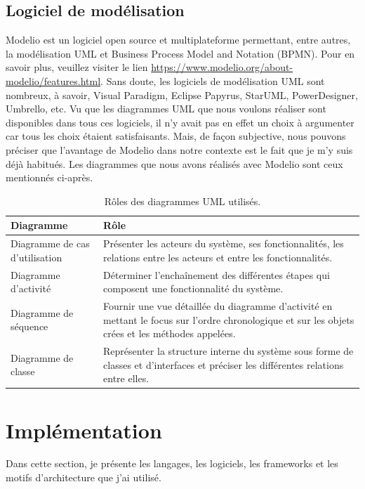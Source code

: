 \subsection{Logiciel de modélisation}
Modelio est un logiciel open source et multiplateforme permettant, entre autres, la modélisation UML et Business Process Model and Notation (BPMN). Pour en savoir plus, veuillez visiter le lien \href{https://www.modelio.org/about-modelio/features.html}{https://www.modelio.org/about-modelio/features.html}.
\newline
Sans doute, les logiciels de modélisation UML sont nombreux, à savoir, Visual Paradigm, Eclipse Papyrus, StarUML, PowerDesigner, Umbrello, etc. Vu que les diagrammes UML que nous voulons réaliser sont disponibles dans tous ces logiciels, il n’y avait pas en effet un choix à argumenter car
tous les choix étaient satisfaisants. Mais, de façon subjective, nous pouvons préciser que l’avantage de Modelio dans notre contexte est le fait que je m'y suis	 déjà habitués. Les diagrammes que nous avons réalisés avec Modelio sont ceux mentionnés ci-après.
\newline\newline
\begin{table}[h]
\begin{tabular}{|m{6cm}|m{10cm}|}
	\hline
	\textbf{Diagramme} & \textbf{Rôle} \\
	\hline
	Diagramme de cas d’utilisation & Présenter les acteurs du système, ses fonctionnalités, les relations entre les acteurs et entre les fonctionnalités. \\
	\hline
	Diagramme d’activité & Déterminer l’enchaînement des différentes étapes qui composent une fonctionnalité du système. \\
	\hline
	Diagramme de séquence & Fournir une vue détaillée du diagramme d’activité en mettant le focus sur l’ordre chronologique et sur les objets crées et les méthodes appelées. \\
	\hline
	Diagramme de classe & Représenter la structure interne du système sous forme de classes et d’interfaces et préciser les différentes relations entre elles. \\
	\hline
\end{tabular}
\caption{Rôles des diagrammes UML utilisés.}
\label{3.1}
\end{table}

\section{Implémentation}
Dans cette section, je présente les langages, les logiciels, les frameworks et les motifs d’architecture que j'ai utilisé.

